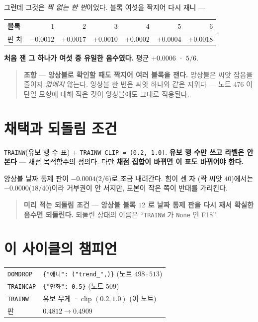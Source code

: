 \documentclass[11pt]{article}
\begin{document}
그런데 그것은 \emph{짝 없는 한 번}이었다. 블록 여섯을 짝지어 다시 재니 ---

\begin{center}
\begin{tabular}{lrrrrrr}
\hline
블록 & $1$ & $2$ & $3$ & $4$ & $5$ & $6$ \\
\hline
판 차 & $\mathbf{-0.0012}$ & $+0.0017$ & $+0.0010$ & $+0.0002$ & $+0.0004$ & $+0.0018$ \\
\hline
\end{tabular}
\end{center}

\textbf{처음 잰 그 하나가 여섯 중 유일한 음수였다.} 평균 $+0.0006$ ·
$5/6$.

\begin{quote}
\textbf{조항} --- \textbf{앙상블로 확인할 때도 짝지어 여러 블록을 잰다.}
앙상블은 씨앗 잡음을 줄이지 \emph{없애지} 않는다. 앙상블 한 번은 씨앗
하나와 같은 지위다 --- 노트 476 이 단일 모형에 대해 적은 것이 앙상블에도
그대로 적용된다.
\end{quote}

\section{채택과 되돌림 조건}

\texttt{TRAINW}(유보 행 수 표) $+$ \texttt{TRAINW\_CLIP = (0.2, 1.0)}.
\textbf{유보 행 수만 쓰고 라벨은 안 본다} --- 채점 목적함수의 정의다.
다만 \textbf{채점 집합이 바뀌면 이 표도 바뀌어야 한다.}

앙상블 날짜 통제 판이 $-0.0004$($2/6$)로 조금 내려간다. 힘이 센 자
(짝 씨앗 $40$)에서는 $-0.0000$($18/40$)이라 거부권이 안 서지만, 표본이
작은 쪽이 반대를 가리킨다.

\begin{quote}
\textbf{미리 적는 되돌림 조건} --- \textbf{앙상블 블록 $12$ 로 날짜 통제
판을 다시 재서 확실한 음수면 되돌린다.} 되돌린 상태의 이름은
``\texttt{TRAINW} 가 \texttt{None} 인 F18''.
\end{quote}

\section*{이 사이클의 챔피언}

\begin{center}
\begin{tabular}{ll}
\hline
\texttt{DOMDROP} & \texttt{\{"애니": ("trend\_",)\}} (노트 $498 \cdot 513$) \\
\texttt{TRAINCAP} & \texttt{\{"만화": 0.5\}} (노트 509) \\
\texttt{TRAINW} & 유보 무게 · clip $(0.2, 1.0)$ (이 노트) \\
\hline
판 & $0.4812 \to \mathbf{0.4909}$ \\
\hline
\end{tabular}
\end{center}
\end{document}
